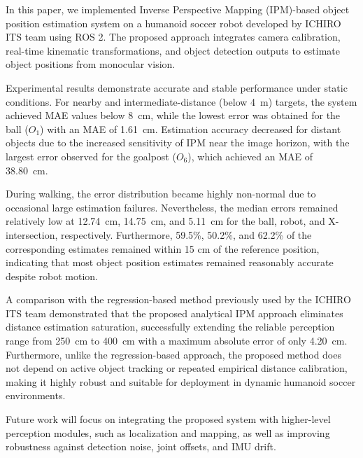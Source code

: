 \documentclass[journal]{IAENGtran}
\begin{document}
In this paper, we implemented Inverse Perspective Mapping (IPM)-based
object position estimation system on a humanoid soccer robot developed
by ICHIRO ITS team using ROS 2. The proposed approach integrates camera calibration,
real-time kinematic transformations, and object detection outputs to estimate
object positions from monocular vision.

Experimental results demonstrate accurate and stable performance under
static conditions. For nearby and intermediate-distance (below 4~m) targets,
the system achieved MAE values below 8~cm, while the lowest error was obtained
for the ball ($O_1$) with an MAE of 1.61~cm. Estimation accuracy decreased for
distant objects due to the increased sensitivity of IPM near the image horizon,
with the largest error observed for the goalpost ($O_6$), which achieved an MAE of
38.80~cm.

During walking, the error distribution became highly non-normal due to
occasional large estimation failures. Nevertheless, the median errors
remained relatively low at 12.74~cm, 14.75~cm, and 5.11~cm for the
ball, robot, and X-intersection, respectively. Furthermore, 59.5\%,
50.2\%, and 62.2\% of the corresponding estimates remained within
15 cm of the reference position, indicating that most object position
estimates remained reasonably accurate despite robot motion.

A comparison with the regression-based method previously used by the ICHIRO ITS 
team demonstrated that the proposed analytical IPM approach eliminates distance 
estimation saturation, successfully extending the reliable perception range from 
250~cm to 400~cm with a maximum absolute error of only 4.20~cm. Furthermore, 
unlike the regression-based approach, the proposed method does not depend on active 
object tracking or repeated empirical distance calibration, making it highly robust 
and suitable for deployment in dynamic humanoid soccer environments.

Future work will focus on integrating the proposed system with higher-level perception
modules, such as localization and mapping, as well as improving robustness against
detection noise, joint offsets, and IMU drift.


\end{document}
